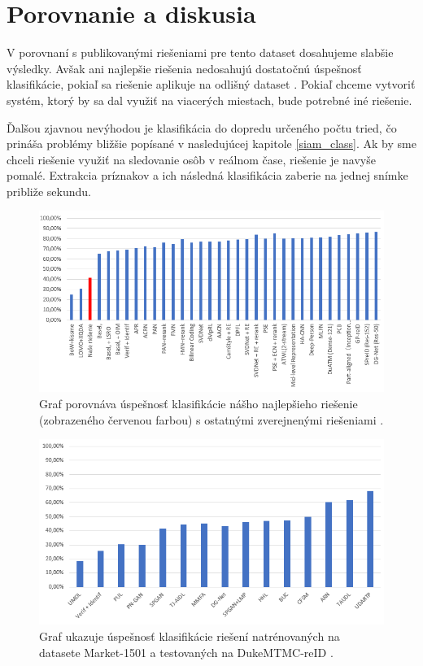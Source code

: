 \section{Porovnanie a diskusia}

V porovnaní s publikovanými riešeniami pre tento dataset dosahujeme slabšie výsledky.
Avšak ani najlepšie riešenia nedosahujú dostatočnú úspešnosť klasifikácie, pokiaľ sa riešenie aplikuje na odlišný dataset \cite{stateofart}.
Pokiaľ chceme vytvoriť systém, ktorý by sa dal využiť na viacerých miestach, bude potrebné iné riešenie.

Ďalšou zjavnou nevýhodou je klasifikácia do dopredu určeného počtu tried, čo prináša problémy bližšie popísané v nasledujúcej kapitole \ref{siam_class}.
Ak by sme chceli riešenie využiť na sledovanie osôb v reálnom čase, riešenie je navyše pomalé.
Extrakcia príznakov a ich následná klasifikácia zaberie na jednej snímke približe sekundu.

\begin{figure}[H]
\centerline{\includegraphics[width=1\textwidth]{images/graph_duke_compare}}
\caption[Výsledky publikovaných riešení v porovnaní s naším riešením]{Graf porovnáva úspešnosť klasifikácie nášho najlepšieho riešenie (zobrazeného červenou farbou) s ostatnými zverejnenými riešeniami \cite{stateofart}.}
\label{obr:graph_duke_compare.png}
\end{figure}


\begin{figure}[H]
\centerline{\includegraphics[width=1\textwidth]{images/graph_duke_different}}
\caption[Výsledky publikovaných riešení pri testovaní na odlišnom datasete]{Graf ukazuje úspešnosť klasifikácie riešení natrénovaných na datasete Market-1501 a testovaných na DukeMTMC-reID \cite{stateofart}.}
\label{obr:graph_duke_different.png}
\end{figure}